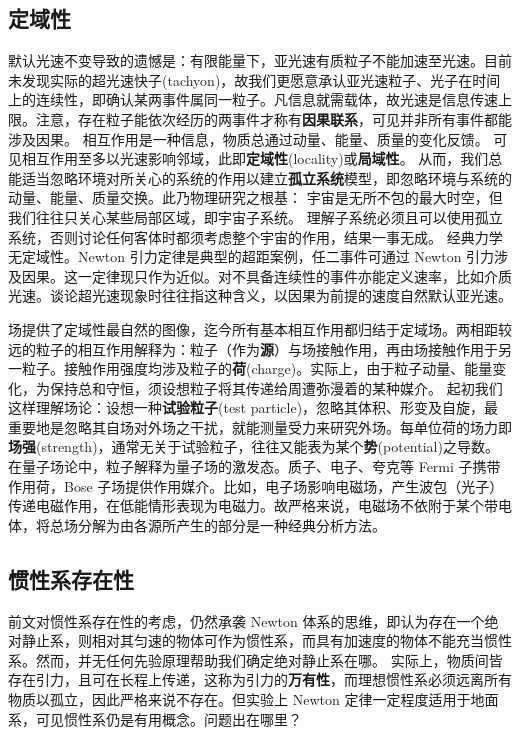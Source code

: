 \subsection{定域性}

默认光速不变导致的遗憾是：有限能量下，亚光速有质粒子不能加速至光速。目前未发现实际的超光速快子(tachyon)，故我们更愿意承认亚光速粒子、光子在时间上的连续性，即确认某两事件属同一粒子。凡信息就需载体，故光速是信息传速上限。注意，存在粒子能依次经历的两事件才称有\textbf{因果联系}，可见并非所有事件都能涉及因果。
相互作用是一种信息，物质总通过动量、能量、质量的变化反馈。
可见相互作用至多以光速影响邻域，此即\textbf{定域性}(locality)或\textbf{局域性}。
从而，我们总能适当忽略环境对所关心的系统的作用以建立\textbf{孤立系统}模型，即忽略环境与系统的动量、能量、质量交换。此乃物理研究之根基：
宇宙是无所不包的最大时空，但我们往往只关心某些局部区域，即宇宙子系统。
理解子系统必须且可以使用孤立系统，否则讨论任何客体时都须考虑整个宇宙的作用，结果一事无成。
经典力学无定域性。Newton 引力定律是典型的超距案例，任二事件可通过 Newton 引力涉及因果。这一定律现只作为近似。对不具备连续性的事件亦能定义速率，比如介质光速。谈论超光速现象时往往指这种含义，以因果为前提的速度自然默认亚光速。

场提供了定域性最自然的图像，迄今所有基本相互作⽤都归结于定域场。两相距较远的粒子的相互作⽤解释为：粒子（作为\textbf{源}）与场接触作用，再由场接触作用于另一粒子。接触作用强度均涉及粒子的\textbf{荷}(charge)。实际上，由于粒子动量、能量变化，为保持总和守恒，须设想粒子将其传递给周遭弥漫着的某种媒介。
起初我们这样理解场论：设想一种\textbf{试验粒子}(test particle)，忽略其体积、形变及自旋，最重要地是忽略其自场对外场之干扰，就能测量受力来研究外场。每单位荷的场力即\textbf{场强}(strength)，通常无关于试验粒子，往往又能表为某个\textbf{势}(potential)之导数。
在量子场论中，粒子解释为量子场的激发态。质子、电子、夸克等 Fermi 子携带作用荷，Bose 子场提供作用媒介。比如，电子场影响电磁场，产生波包（光子）传递电磁作用，在低能情形表现为电磁力。故严格来说，电磁场不依附于某个带电体，将总场分解为由各源所产生的部分是一种经典分析方法。


\subsection{惯性系存在性}

前文对惯性系存在性的考虑，仍然承袭 Newton 体系的思维，即认为存在一个绝对静止系，则相对其匀速的物体可作为惯性系，而具有加速度的物体不能充当惯性系。然而，并无任何先验原理帮助我们确定绝对静止系在哪。
实际上，物质间皆存在引力，且可在长程上传递，这称为引力的\textbf{万有性}，而理想惯性系必须远离所有物质以孤立，因此严格来说不存在。但实验上 Newton 定律一定程度适用于地面系，可见惯性系仍是有用概念。问题出在哪里？

